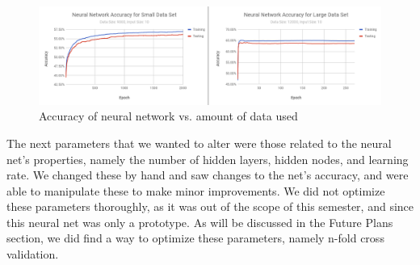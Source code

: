 \begin{figure}[ht]
    \centering
    \includegraphics[width=1\textwidth, frame]{figures/accuracyData}
    \caption{Accuracy of neural network vs. amount of data used}
    \label{fig:accuracyData}
\end{figure}


The next parameters that we wanted to alter were those related to the neural net's properties, namely the number of hidden layers, hidden nodes, and learning rate. We changed these by hand and saw changes to the net's accuracy, and were able to manipulate these to make minor improvements. We did not optimize these parameters thoroughly, as it was out of the scope of this semester, and since this neural net was only a prototype. As will be discussed in the Future Plans section, we did find a way to optimize these parameters, namely n-fold cross validation. 
